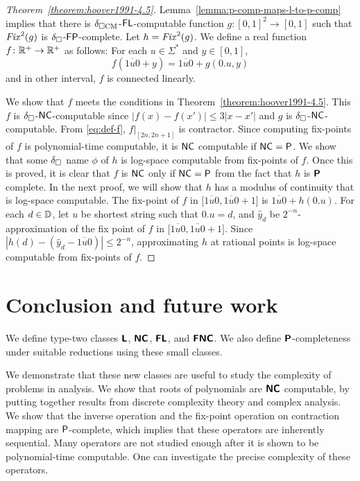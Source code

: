 \documentclass[envcountsame,orivec,oribibl]{llncs}
\begin{document}
\begin{proof}
[Theorem~\ref{theorem:hoover1991-4.5}]
 Lemma~\ref{lemma:p-comp-maps-l-to-p-comp} implies that
 there is $\delta _{\square \mathrm{CM}}$-$\mathsf{FL}$-computable function 
 $g \colon [0,1]^2 \to [0,1]$ such that $\mathit{Fix}^2(g)$ is
 $\delta _\square$-$\mathsf{FP}$-complete. Let $h = \mathit{Fix}^2(g)$.
 We define a real function $f \colon \mathbb R^+ \to \mathbb R^+$ as follows:
 For each $u \in \Sigma^*$ and $y \in [0, 1]$,
 \begin{equation}
  \label{eq:def-f}
 f(\overline{1u0} + y) = \overline{1u0} + g(0.u, y)
 \end{equation}
 and in other interval, $f$ is connected linearly.

 We show that $f$ meets the conditions in Theorem~\ref{theorem:hoover1991-4.5}.
 This $f$ is $\delta _\square$-$\mathsf{NC}$-computable since 
 $|f(x) - f(x')| \le 3|x-x'|$ and $g$ is $\delta _\square$-$\mathsf{NC}$-computable.
 From \eqref{eq:def-f},  $f|_{[2n, 2n+1]}$ is contractor.
 Since computing fix-points of $f$ is polynomial-time computable, 
 it is $\mathsf{NC}$ computable if $\mathsf{NC} = \mathsf{P}$.
 We show that some $\delta _\square$ name $\phi$ of $h$ is log-space computable 
 from fix-points of $f$.
 Once this is proved, it is clear that $f$ is $\mathsf{NC}$ only if 
 $\mathsf{NC} = \mathsf{P}$ from the fact that $h$ is $\text{\bfseries \sffamily \upshape P}$ complete.
 In the next proof, we will show that $h$ has a modulus of continuity that is
 log-space computable. 
 The fix-point of $f$ in $\bigl[ \overline{1u0}, \overline{1u0}+1 \bigr]$ is
 $\overline{1u0} + h(0.u)$.
 For each $d \in \mathbb D$, let $u$ be shortest string such that $0.u = d$,
 and $\hat y_d$ be $2^{-n}$-approximation of the fix point of $f$ in
 $\bigl[ \overline{1u0}, \overline{1u0}+1 \bigr]$.
 Since  $\left|h(d) - \left( \hat y_d - \overline{1u0} \right)\right| \le 2^{-n}$,
 approximating $h$ at rational points is log-space computable from fix-points of $f$.
\end{proof}

\section{Conclusion and future work}
\label{chapter:conclusion}

We define type-two classes $\text{\bfseries \sffamily \upshape L}$, $\text{\bfseries \sffamily \upshape NC}$, $\text{\bfseries \sffamily \upshape FL}$,
and $\text{\bfseries \sffamily \upshape FNC}$.
We also define $\text{\bfseries \sffamily \upshape P}$-completeness 
under suitable reductions using these small classes.


We demonstrate that these new classes are useful to study the complexity 
of problems in analysis.
We show that roots of polynomials are $\text{\bfseries \sffamily \upshape NC}$ computable,
by putting together results from discrete complexity theory and
 complex analysis.
We show that the inverse operation and the fix-point operation on contraction mapping are $\mathsf{P}$-complete, which implies that these operators are inherently sequential.
Many operators are not studied enough after it is shown to be polynomial-time
computable.
One can investigate the precise complexity of these operators.
\end{document}
